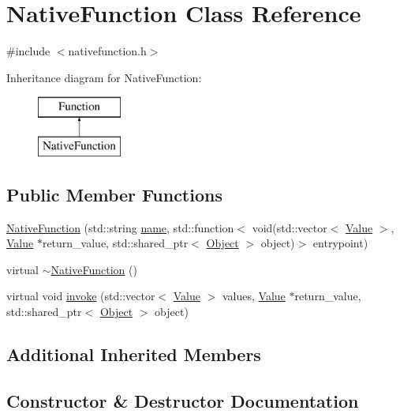 \hypertarget{classNativeFunction}{}\section{Native\+Function Class Reference}
\label{classNativeFunction}


{\ttfamily \#include $<$nativefunction.\+h$>$}

Inheritance diagram for Native\+Function\+:\begin{figure}[H]
\begin{center}
\leavevmode
\includegraphics[height=2.000000cm]{classNativeFunction}
\end{center}
\end{figure}
\subsection*{Public Member Functions}
\begin{DoxyCompactItemize}
\item 
\hyperlink{classNativeFunction_adb5628f86e150f797e8225bf9388fadc}{Native\+Function} (std\+::string \hyperlink{classFunction_a161d1ceb4f67f3222caf429fea7b71f1}{name}, std\+::function$<$ void(std\+::vector$<$ \hyperlink{classValue}{Value} $>$, \hyperlink{classValue}{Value} $\ast$return\+\_\+value, std\+::shared\+\_\+ptr$<$ \hyperlink{classObject}{Object} $>$ object)$>$ entrypoint)
\item 
virtual \hyperlink{classNativeFunction_aa6055c6a092b8be8d1f9009efc6db0e0}{$\sim$\+Native\+Function} ()
\item 
virtual void \hyperlink{classNativeFunction_a0f003d805cbc3625e311d1b2a1b861d9}{invoke} (std\+::vector$<$ \hyperlink{classValue}{Value} $>$ values, \hyperlink{classValue}{Value} $\ast$return\+\_\+value, std\+::shared\+\_\+ptr$<$ \hyperlink{classObject}{Object} $>$ object)
\end{DoxyCompactItemize}
\subsection*{Additional Inherited Members}


\subsection{Constructor \& Destructor Documentation}
\mbox{\label{classNativeFunction_adb5628f86e150f797e8225bf9388fadc}} 
